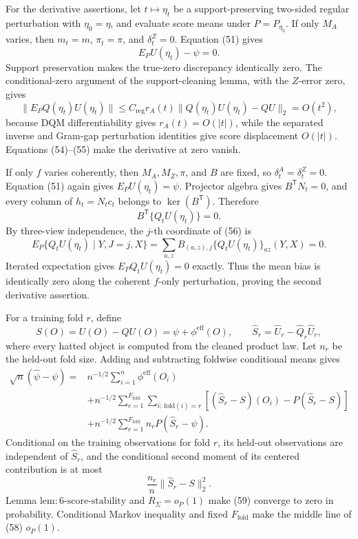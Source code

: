 For the derivative assertions, let \(t\mapsto\eta_t\) be a support-preserving two-sided regular perturbation with \(\eta_0=\eta\), and evaluate score means under \(P=P_{\eta_0}\).  If only \(M_A\) varies, then \(m_t=m\), \(\pi_t=\pi\), and \(\delta_t^Z=0\).  Equation (51) gives
\[
 E_PU(\eta_t)-\psi=0. \tag{54}
\]
Support preservation makes the true-zero discrepancy identically zero.  The conditional-zero argument of the support-cleaning lemma, with the \(Z\)-error zero, gives
\[
 \|E_PQ(\eta_t)U(\eta_t)\|
 \leq C_{\mathrm{reg}}r_A(t)
 \|Q(\eta_t)U(\eta_t)-QU\|_2=O(t^2), \tag{55}
\]
because DQM differentiability gives \(r_A(t)=O(|t|)\), while the separated inverse and Gram-gap perturbation identities give score displacement \(O(|t|)\).  Equations (54)--(55) make the derivative at zero vanish.

If only \(f\) varies coherently, then \(M_A,M_Z,\pi\), and \(B\) are fixed, so
\(\delta_t^A=\delta_t^Z=0\).  Equation (51) again gives \(E_PU(\eta_t)=\psi\).  Projector algebra gives \(B^{\mathsf T}N_t=0\), and every column of \(h_t=N_tc_t\) belongs to \(\ker(B^{\mathsf T})\).  Therefore
\[
 B^{\mathsf T}\{Q_tU(\eta_t)\}=0. \tag{56}
\]
By three-view independence, the \(j\)-th coordinate of (56) is
\[
 E_P\{Q_tU(\eta_t)\mid Y,J=j,X\}
 =\sum_{a,z}B_{(a,z),j}\{Q_tU(\eta_t)\}_{az}(Y,X)=0.
\]
Iterated expectation gives \(E_PQ_tU(\eta_t)=0\) exactly.  Thus the mean bias is identically zero along the coherent \(f\)-only perturbation, proving the second derivative assertion.

For a training fold \(r\), define
\[
 S(O)=U(O)-QU(O)=\psi+\phi^{\mathrm{eff}}(O),\qquad
 \widehat S_r=\widehat U_r-\widehat Q_r\widehat U_r, \tag{57}
\]
where every hatted object is computed from the cleaned product law.  Let \(n_r\) be the held-out fold size.  Adding and subtracting foldwise conditional means gives
\[
\begin{aligned}
 \sqrt n(\widehat\psi-\psi)
={}&n^{-1/2}\sum_{i=1}^n\phi^{\mathrm{eff}}(O_i)\\
&+n^{-1/2}\sum_{r=1}^{F_{\mathrm{fold}}}
 \sum_{i:\,\mathrm{fold}(i)=r}
 [(\widehat S_r-S)(O_i)-P(\widehat S_r-S)]\\
&+n^{-1/2}\sum_{r=1}^{F_{\mathrm{fold}}}n_rP(\widehat S_r-\psi). \tag{58}
\end{aligned}
\]
Conditional on the training observations for fold \(r\), its held-out observations are independent of \(\widehat S_r\), and the conditional second moment of its centered contribution is at most
\[
 \frac{n_r}{n}\|\widehat S_r-S\|_2^2. \tag{59}
\]
Lemma \(\mathrm{lem{:}6\mbox{-}score\mbox{-}stability}\) and \(R_\Sigma=o_P(1)\) make (59) converge to zero in probability.  Conditional Markov inequality and fixed \(F_{\mathrm{fold}}\) make the middle line of (58) \(o_P(1)\).

